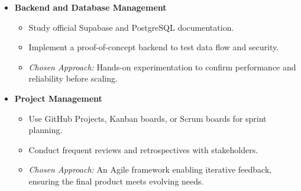 \documentclass[12pt]{article}
\begin{document}
\begin{enumerate}
\begin{itemize}
    \item \textbf{Backend and Database Management}
    \begin{itemize}
      \item Study official Supabase and PostgreSQL documentation.
      \item Implement a proof-of-concept backend to test data flow and security.
      \item \textit{Chosen Approach:} Hands-on experimentation to confirm performance and reliability before scaling.
    \end{itemize}

    \item \textbf{Project Management}
    \begin{itemize}
      \item Use GitHub Projects, Kanban boards, or Scrum boards for sprint planning.
      \item Conduct frequent reviews and retrospectives with stakeholders.
      \item \textit{Chosen Approach:} An Agile framework enabling iterative feedback, ensuring the final product meets evolving needs.
    \end{itemize}
  \end{itemize}
\end{enumerate}
\end{document}
